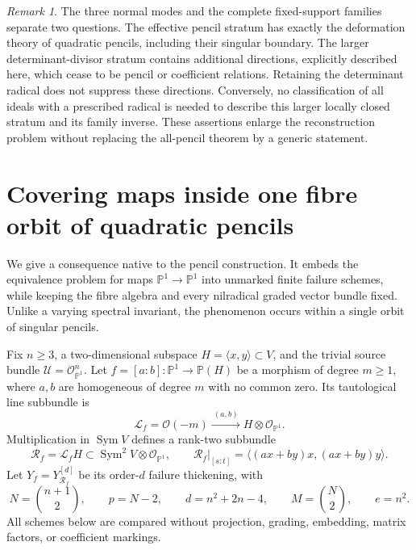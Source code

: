 \documentclass[11pt,reqno]{amsart}
\numberwithin{equation}{section}
\theoremstyle{definition}\newtheorem{definition}[theorem]{Definition}
\theoremstyle{remark}\newtheorem{remark}[theorem]{Remark}
\newcommand{\Pj}{\mathbb P}\newcommand{\A}{\mathbb A}
\newcommand{\OO}{\mathcal O}\newcommand{\II}{\mathcal I}
\DeclareMathOperator{\Sym}{Sym}\DeclareMathOperator{\Gr}{Gr}
\begin{document}
\begin{remark}\label{rem:scope-transverse}
The three normal modes and the complete fixed-support families
separate two questions.  The effective pencil stratum has exactly
the deformation theory of quadratic pencils, including their
singular boundary.  The larger determinant-divisor stratum contains
additional directions, explicitly described here, which cease to
be pencil or coefficient relations.  Retaining the determinant
radical does not suppress these directions.  Conversely, no
classification of all ideals with a prescribed radical is needed
to describe this larger locally closed stratum and its family
inverse.  These assertions enlarge the reconstruction problem
without replacing the all-pencil theorem by a generic statement.
\end{remark}


\section{Covering maps inside one fibre orbit of quadratic pencils}
\label{sec:covering-moduli-v148}

We give a consequence native to the pencil construction.  It embeds
the equivalence problem for maps \(\Pj^1\to\Pj^1\) into
unmarked finite failure schemes, while keeping the fibre algebra
and every nilradical graded vector bundle fixed.  Unlike a varying
spectral invariant, the phenomenon occurs within a single orbit
of singular pencils.

Fix \(n\ge3\), a two-dimensional subspace
\(H=\langle x,y\rangle\subset V\), and the trivial source
bundle \(\mathcal U=\OO_{\Pj^1}^n\).  Let
\(f=[a:b]:\Pj^1\to\Pj(H)\) be a morphism of degree
\(m\ge1\), where \(a,b\) are homogeneous of degree \(m\)
with no common zero.  Its tautological line subbundle is
\[
 \mathcal L_f=\OO(-m)
       \xrightarrow{\ (a,b)\ }H\otimes\OO_{\Pj^1}.
\]
Multiplication in \(\Sym V\) defines a rank-two subbundle
\begin{equation}\label{eq:cover-pencil-v148}
 \mathcal R_f=\mathcal L_f H
       \subset\Sym^2V\otimes\OO_{\Pj^1},
 \qquad
 \mathcal R_f|_{[s:t]}=
   \langle (ax+by)x,(ax+by)y\rangle.
\end{equation}
Let \(Y_f=Y_{\mathcal R_f}^{[d]}\) be its order-\(d\)
failure thickening, with
\[
 N=\binom{n+1}{2},\qquad p=N-2,\qquad
 d=n^2+2n-4,\qquad M=\binom N2,\qquad e=n^2.
\]
All schemes below are compared without projection, grading,
embedding, matrix factors, or coefficient markings.
\end{document}
